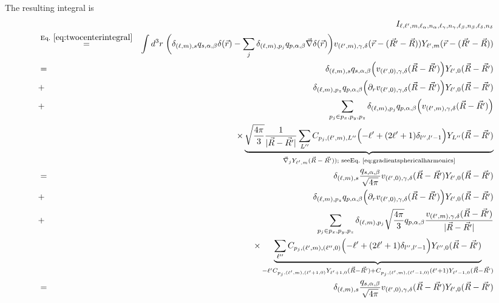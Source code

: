 \documentclass[11pt,a4paper]{report}
\begin{document}
The resulting integral is
\begin{eqnarray}
&&I_{\ell,\ell',m,\ell_\alpha,n_\alpha,\ell_\gamma,n_\gamma,\ell_\beta,n_\beta,\ell_\delta,n_\delta}
\nonumber\\
&\eqrel{eq:twocenterintegral}{=}&\int d^3r\;
\biggl(
\delta_{(\ell,m),s}
q_{s,\alpha,\beta}\delta(\vec{r})
-
\sum_j \delta_{(\ell,m),p_j}q_{p,\alpha,\beta}\vec{\nabla}\delta(\vec{r})\biggr)
v_{(\ell',m),\gamma,\delta}(\vec{r}-(\vec{R'}-\vec{R})) Y_{\ell',m}(\vec{r}-(\vec{R'}-\vec{R}))
\nonumber\\
%
%
%
&=&
\delta_{(\ell,m),s}
q_{s,\alpha,\beta}
\Bigl(v_{(\ell',0),\gamma,\delta}(\vec{R}-\vec{R'})\Bigr)
Y_{\ell',0}(\vec{R}-\vec{R'})
\nonumber\\
&+&
\delta_{(\ell,m),p_z}q_{p,\alpha,\beta}
\Bigl(\partial_rv_{(\ell',0),\gamma,\delta}(\vec{R}-\vec{R'}) \Bigr)
Y_{\ell',0}(\vec{R}-\vec{R'}) 
\nonumber\\
&+&\sum_{p_j\in p_x,p_y,p_z} \delta_{(\ell,m),p_j}q_{p,\alpha,\beta}
\Bigl(v_{(\ell',m),\gamma,\delta}(\vec{R}-\vec{R'})\Bigr)
\nonumber\\
&&\times\underbrace{
\sqrt{\frac{4\pi}{3}}\frac{1}{|\vec{R}-\vec{R'}|}
\sum_{L''}C_{p_j,(\ell',m),L''}\Bigl(-\ell'+(2\ell'+1)\delta_{l'',l'-1}\Bigr)
Y_{L''}(\vec{R}-\vec{R'})
}_{\text{$\vec{\nabla}_j Y_{\ell',m}(\vec{R}-\vec{R'}))$; see\eq{eq:gradientsphericalharmonics}}}
\nonumber\\
%
%
%
&=&
\delta_{(\ell,m),s}\frac{q_{s,\alpha,\beta}}{\sqrt{4\pi}}
v_{(\ell',0),\gamma,\delta}(\vec{R}-\vec{R'}) 
Y_{\ell',0}(\vec{R}-\vec{R'})
\nonumber\\
&+&
\delta_{(\ell,m),p_z}q_{p,\alpha,\beta}
\Bigl(\partial_rv_{(\ell',0),\gamma,\delta}(\vec{R}-\vec{R'}) \Bigr)
Y_{\ell',0}(\vec{R}-\vec{R'}) 
\nonumber\\
&+&\sum_{p_j\in p_x,p_y,p_z} \delta_{(\ell,m),p_j}\sqrt{\frac{4\pi}{3}}q_{p,\alpha,\beta}
\frac{v_{(\ell',m),\gamma,\delta}(\vec{R}-\vec{R'})}{|\vec{R}-\vec{R'}|}
\nonumber\\
&&\times\underbrace{
\sum_{\ell''}C_{p_j,(\ell',m),(\ell'',0)}\Bigl(-\ell'+(2\ell'+1)\delta_{l'',l'-1}\Bigr)
Y_{\ell'',0}(\vec{R}-\vec{R'})
}_{-\ell' C_{p_j,(\ell',m),(\ell'+1,0)} Y_{\ell'+1,0}(\vec{R}-\vec{R'})
+C_{p_j,(\ell',m),(\ell'-1,0)}(\ell'+1)Y_{\ell'-1,0}(\vec{R}-\vec{R'})
}
\nonumber\\
%
%
%
&=&
\delta_{(\ell,m),s}\frac{q_{s,\alpha,\beta}}{\sqrt{4\pi}}
v_{(\ell',0),\gamma,\delta}(\vec{R}-\vec{R'}) 
Y_{\ell',0}(\vec{R}-\vec{R'})
\nonumber\\

\end{eqnarray}
\end{document}

